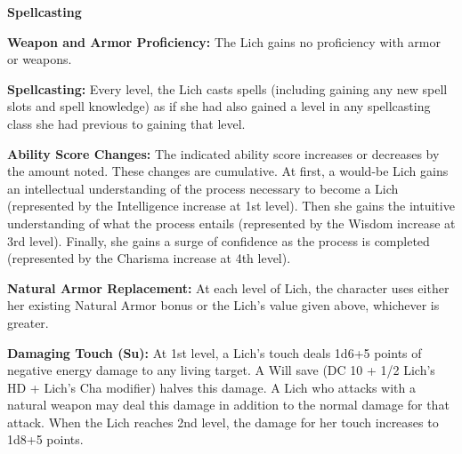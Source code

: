 \begin{extraclasstable}{\textbf{Spellcasting}}
\end{extraclasstable}

\classfeatures

\textbf{Weapon and Armor Proficiency:} The Lich gains no proficiency with armor or weapons.

\textbf{Spellcasting:} Every level, the Lich casts spells (including gaining any new spell slots and spell knowledge) as if she had also gained a level in any spellcasting class she had previous to gaining that level.

\textbf{Ability Score Changes:} The indicated ability score increases or decreases by the amount noted. These changes are cumulative. At first, a would-be Lich gains an intellectual understanding of the process necessary to become a Lich (represented by the Intelligence increase at 1st level). Then she gains the intuitive understanding of what the process entails (represented by the Wisdom increase at 3rd level). Finally, she gains a surge of confidence as the process is completed (represented by the Charisma increase at 4th level).

\textbf{Natural Armor Replacement:} At each level of Lich, the character uses either her existing Natural Armor bonus or the Lich's value given above, whichever is greater.

\textbf{Damaging Touch (Su):} At 1st level, a Lich's touch deals 1d6+5 points of negative energy damage to any living target. A Will save (DC 10 + 1/2 Lich's HD + Lich's Cha modifier) halves this damage. A Lich who attacks with a natural weapon may deal this damage in addition to the normal damage for that attack. When the Lich reaches 2nd level, the damage for her touch increases to 1d8+5 points.

